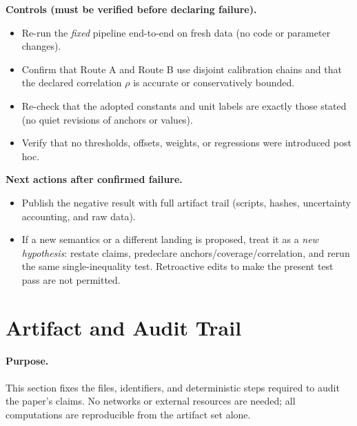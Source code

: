\documentclass[11pt]{article}
\theoremstyle{plain}
\theoremstyle{definition}
\theoremstyle{remark}
\begin{document}
\textbf{Controls (must be verified before declaring failure).}
\begin{itemize}
  \item Re-run the \emph{fixed} pipeline end-to-end on fresh data (no code or parameter changes).
  \item Confirm that Route A and Route B use disjoint calibration chains and that the declared correlation \(\rho\) is accurate or conservatively bounded.
  \item Re-check that the adopted constants and unit labels are exactly those stated (no quiet revisions of anchors or values).
  \item Verify that no thresholds, offsets, weights, or regressions were introduced post hoc.
\end{itemize}

\textbf{Next actions after confirmed failure.}
\begin{itemize}
  \item Publish the negative result with full artifact trail (scripts, hashes, uncertainty accounting, and raw data).
  \item If a new semantics or a different landing is proposed, treat it as a \emph{new hypothesis}: restate claims, predeclare anchors/coverage/correlation, and rerun the same single-inequality test. Retroactive edits to make the present test pass are not permitted.
\end{itemize}

\section{Artifact and Audit Trail}

\paragraph{Purpose.}
This section fixes the files, identifiers, and deterministic steps required to audit the paper’s claims. No networks or external resources are needed; all computations are reproducible from the artifact set alone.
\end{document}
